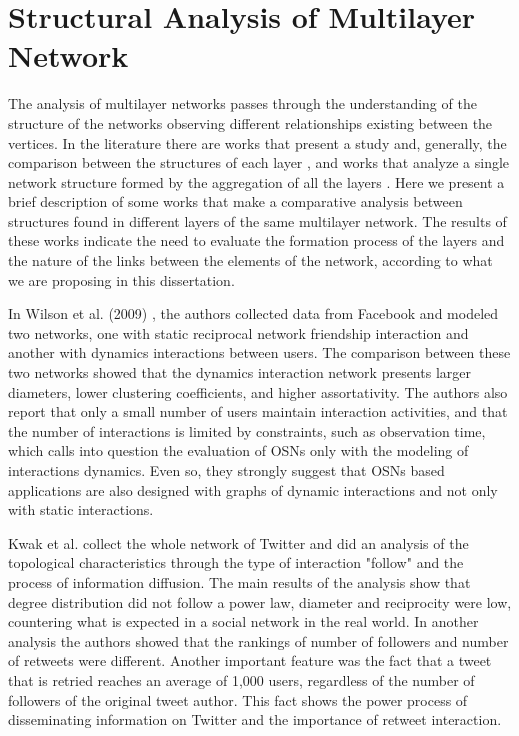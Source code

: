\section{Structural Analysis of Multilayer Network}
\label{sec:multilayer_net_analysis}

The analysis of multilayer networks passes through the understanding of the structure of the networks observing different relationships existing between the vertices. In the literature there are works that present a study and, generally, the comparison between the structures of each layer \cite{Wilson2009,Kwak:2010,Szell2010,Cardilo2013,Nicosia2015,Amati2015,Darmon2015,Omodei2015,DeArruda2016,Hong2016}, and works that analyze a single network structure formed by the aggregation of all the layers \cite{Boccaletti2014,Azaza2015,DeDomenico2015,Kuncheva2015,Hajibagheri2016,Azaza2016,Kleineberg2016,Vahedian:2017,Ding2017}. Here we present a brief description of some works that make a comparative analysis between structures found in different layers of the same multilayer network. The results of these works indicate the need to evaluate the formation process of the layers and the nature of the links between the elements of the network, according to what we are proposing in this dissertation.

In Wilson et al. (2009) \cite{Wilson2009}, the authors collected data from Facebook and modeled two networks, one with static reciprocal network friendship interaction and another with dynamics interactions between users. The comparison between these two networks showed that the dynamics interaction network presents larger diameters, lower clustering coefficients, and higher assortativity. The authors also report that only a small number of users maintain interaction activities, and that the number of interactions is limited by constraints, such as observation time, which calls into question the evaluation of OSNs only with the modeling of interactions dynamics. Even so, they strongly suggest that OSNs based applications are also designed with graphs of dynamic interactions and not only with static interactions.

Kwak et al. \cite{Kwak:2010} collect the whole network of Twitter and did an analysis of the topological characteristics through the type of interaction "follow" and the process of information diffusion. The main results of the analysis show that degree distribution did not follow a power law, diameter and reciprocity were low, countering what is expected in a social network in the real world. In another analysis the authors showed that the rankings of number of followers and number of retweets were different. Another important feature was the fact that a tweet that is retried reaches an average of 1,000 users, regardless of the number of followers of the original tweet author. This fact shows the power process of disseminating information on Twitter and the importance of retweet interaction.

